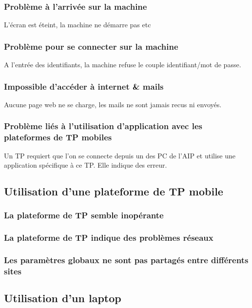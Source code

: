 \documentclass[a4paper]{article}
\begin{document}
\subsubsection{Problème à l'arrivée sur la machine}
L'écran est éteint, la machine ne démarre pas etc

\subsubsection{Problème pour se connecter sur la machine}
A l'entrée des identifiants, la machine refuse le couple identifiant/mot de passe.

\subsubsection{Impossible d'accéder à internet \& mails}
Aucune page web ne se charge, les mails ne sont jamais recus ni envoyés.

\subsubsection{Problème liés à l'utilisation d'application avec les plateformes de TP mobiles}
Un TP requiert que l'on se connecte depuis un des PC de l'AIP et utilise une application spécifique à ce TP. Elle indique des erreur.
		
\subsection{Utilisation d'une plateforme de TP mobile}
\subsubsection{La plateforme de TP semble inopérante}

\subsubsection{La plateforme de TP indique des problèmes réseaux}

\subsubsection{Les paramètres globaux ne sont pas partagés entre différents sites}

\subsection{Utilisation d'un laptop}
\end{document}

